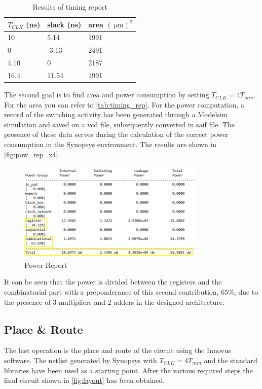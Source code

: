 \begin{table}[h]
\begin{center}
\begin{tabular}{|l|l|l|}
\hline
$T_{CLK}$ (ns) & slack (ns) & area $(\SI{}{\micro\meter})^2$ \\
\hline
10 & 5.14 & 1991 \\
0 & -3.13 & 2491 \\
4.10 & 0 & 2187 \\
16.4 & 11.54 & 1991 \\
\hline
\end{tabular}
\end{center}
\caption{Results of timing report}
\label{tab:timing_rep}
\end{table}

The second goal is to find area and power consumption by setting $T_{CLK} = 4 T_{min}$. For the area you can refer to \autoref{tab:timing_rep}. For the power computation, a record of the switching activity has been generated through a Modelsim simulation and saved on a vcd file, subsequently converted in saif file. The presence of these data serves during the calculation of the correct power consumption in the Synopsys environment. The results are shown in \autoref{fig:pow_rep_x4}.

\begin{figure}[htb]
	\center
	\includegraphics[width=0.8\textwidth]{images/rep_power_x4_mod.png}
	\caption{Power Report}
	\label{fig:pow_rep_x4}
\end{figure}

It can be seen that the power is divided between the registers and the combinatorial part with a preponderance of this second contribution, $65\%$, due to the presence of 3 multipliers and 2 adders in the designed architecture.

\subsection{Place \& Route}
The last operation is the place and route of the circuit using the Innovus software. The netlist generated by Synopsys with $T_{CLK} = 4 T_{min}$ and the standard libraries have been used as a starting point. After the various required steps the final circuit shown in \autoref{fig:layout} has been obtained.

